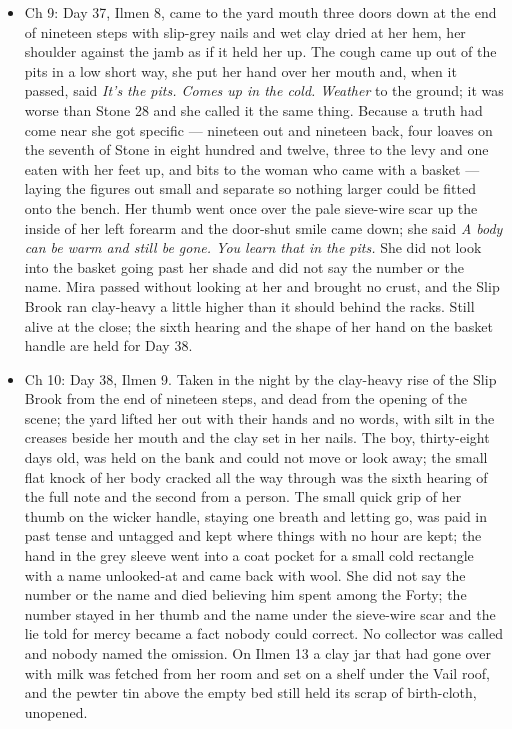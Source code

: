 \documentclass{design/chronicle}
\begin{document}
{\begin{itemize}[leftmargin=1.4em,itemsep=1pt,topsep=3pt,parsep=0pt]
\end{itemize}

\begin{itemize}[leftmargin=1.4em,itemsep=1pt,topsep=3pt,parsep=0pt]

\item Ch 9: Day 37, Ilmen 8, came to the yard mouth three doors down at the end of nineteen steps with slip-grey nails and wet clay dried at her hem, her shoulder against the jamb as if it held her up. The cough came up out of the pits in a low short way, she put her hand over her mouth and, when it passed, said \emph{It’s the pits. Comes up in the cold. Weather} to the ground; it was worse than Stone 28 and she called it the same thing. Because a truth had come near she got specific --- nineteen out and nineteen back, four loaves on the seventh of Stone in eight hundred and twelve, three to the levy and one eaten with her feet up, and bits to the woman who came with a basket --- laying the figures out small and separate so nothing larger could be fitted onto the bench. Her thumb went once over the pale sieve-wire scar up the inside of her left forearm and the door-shut smile came down; she said \emph{A body can be warm and still be gone. You learn that in the pits.} She did not look into the basket going past her shade and did not say the number or the name. Mira passed without looking at her and brought no crust, and the Slip Brook ran clay-heavy a little higher than it should behind the racks. Still alive at the close; the sixth hearing and the shape of her hand on the basket handle are held for Day 38.

\end{itemize}

\begin{itemize}[leftmargin=1.4em,itemsep=1pt,topsep=3pt,parsep=0pt]

\item Ch 10: Day 38, Ilmen 9. Taken in the night by the clay-heavy rise of the Slip Brook from the end of nineteen steps, and dead from the opening of the scene; the yard lifted her out with their hands and no words, with silt in the creases beside her mouth and the clay set in her nails. The boy, thirty-eight days old, was held on the bank and could not move or look away; the small flat knock of her body cracked all the way through was the sixth hearing of the full note and the second from a person. The small quick grip of her thumb on the wicker handle, staying one breath and letting go, was paid in past tense and untagged and kept where things with no hour are kept; the hand in the grey sleeve went into a coat pocket for a small cold rectangle with a name unlooked-at and came back with wool. She did not say the number or the name and died believing him spent among the Forty; the number stayed in her thumb and the name under the sieve-wire scar and the lie told for mercy became a fact nobody could correct. No collector was called and nobody named the omission. On Ilmen 13 a clay jar that had gone over with milk was fetched from her room and set on a shelf under the Vail roof, and the pewter tin above the empty bed still held its scrap of birth-cloth, unopened.


\end{itemize}}
\end{document}
